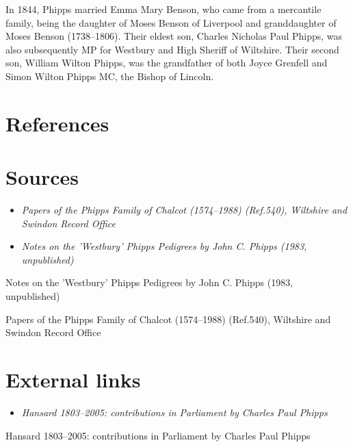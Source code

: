 In 1844, Phipps married Emma Mary Benson, who came from a mercantile
family, being the daughter of Moses Benson of Liverpool and
granddaughter of Moses Benson (1738--1806). Their eldest son, Charles
Nicholas Paul Phipps, was also subsequently MP for Westbury and High
Sheriff of Wiltshire. Their second son, William Wilton Phipps, was the
grandfather of both Joyce Grenfell and Simon Wilton Phipps MC, the
Bishop of Lincoln.

\section{References}\label{references}

\section{Sources}\label{sources}

\begin{itemize}
\item
  \emph{Papers of the Phipps Family of Chalcot (1574--1988) (Ref.540),
  Wiltshire and Swindon Record Office}
\item
  \emph{Notes on the 'Westbury' Phipps Pedigrees by John C. Phipps
  (1983, unpublished)}
\end{itemize}

Notes on the 'Westbury' Phipps Pedigrees by John C. Phipps (1983,
unpublished)

Papers of the Phipps Family of Chalcot (1574--1988) (Ref.540), Wiltshire
and Swindon Record Office

\section{External links}\label{external-links}

\begin{itemize}
\item
  \emph{Hansard 1803--2005: contributions in Parliament by Charles Paul
  Phipps}
\end{itemize}

Hansard 1803--2005: contributions in Parliament by Charles Paul Phipps
